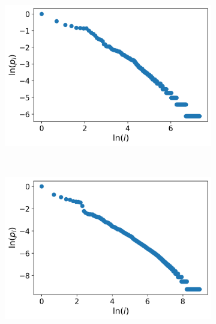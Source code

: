 \documentclass[10pt]{article}
\begin{document}
\begin{flushleft}
\begin{figure}[ht]
\begin{minipage}{0.65\linewidth}
\begin{subfigure}{0.32\linewidth}
            \caption{}
        \end{subfigure}
        \begin{subfigure}{0.32\linewidth}
            \includegraphics[width=0.99\linewidth]{images/trump.png}
            \caption{}
        \end{subfigure}
        \\
        \begin{subfigure}{0.32\linewidth}
            \includegraphics[width=0.99\linewidth]{images/feynmann.png}
            \caption{}
        \end{subfigure}
        \begin{subfigure}{0.32\linewidth}

\end{subfigure}
\end{minipage}
\end{figure}
\end{flushleft}
\end{document}
